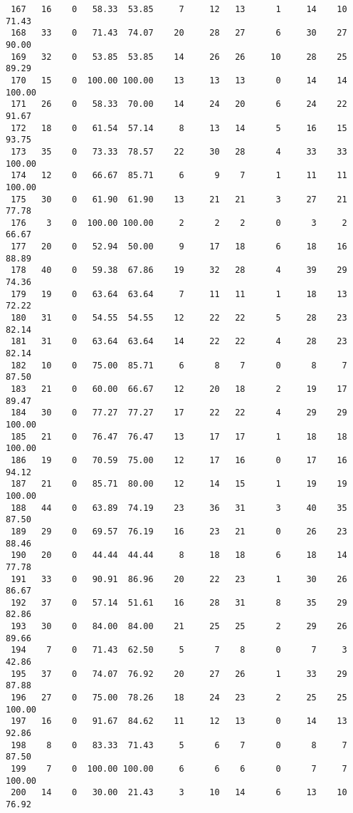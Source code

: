 \begin{verbatim}
 167   16    0   58.33  53.85     7     12   13      1     14    10    71.43
 168   33    0   71.43  74.07    20     28   27      6     30    27    90.00
 169   32    0   53.85  53.85    14     26   26     10     28    25    89.29
 170   15    0  100.00 100.00    13     13   13      0     14    14   100.00
 171   26    0   58.33  70.00    14     24   20      6     24    22    91.67
 172   18    0   61.54  57.14     8     13   14      5     16    15    93.75
 173   35    0   73.33  78.57    22     30   28      4     33    33   100.00
 174   12    0   66.67  85.71     6      9    7      1     11    11   100.00
 175   30    0   61.90  61.90    13     21   21      3     27    21    77.78
 176    3    0  100.00 100.00     2      2    2      0      3     2    66.67
 177   20    0   52.94  50.00     9     17   18      6     18    16    88.89
 178   40    0   59.38  67.86    19     32   28      4     39    29    74.36
 179   19    0   63.64  63.64     7     11   11      1     18    13    72.22
 180   31    0   54.55  54.55    12     22   22      5     28    23    82.14
 181   31    0   63.64  63.64    14     22   22      4     28    23    82.14
 182   10    0   75.00  85.71     6      8    7      0      8     7    87.50
 183   21    0   60.00  66.67    12     20   18      2     19    17    89.47
 184   30    0   77.27  77.27    17     22   22      4     29    29   100.00
 185   21    0   76.47  76.47    13     17   17      1     18    18   100.00
 186   19    0   70.59  75.00    12     17   16      0     17    16    94.12
 187   21    0   85.71  80.00    12     14   15      1     19    19   100.00
 188   44    0   63.89  74.19    23     36   31      3     40    35    87.50
 189   29    0   69.57  76.19    16     23   21      0     26    23    88.46
 190   20    0   44.44  44.44     8     18   18      6     18    14    77.78
 191   33    0   90.91  86.96    20     22   23      1     30    26    86.67
 192   37    0   57.14  51.61    16     28   31      8     35    29    82.86
 193   30    0   84.00  84.00    21     25   25      2     29    26    89.66
 194    7    0   71.43  62.50     5      7    8      0      7     3    42.86
 195   37    0   74.07  76.92    20     27   26      1     33    29    87.88
 196   27    0   75.00  78.26    18     24   23      2     25    25   100.00
 197   16    0   91.67  84.62    11     12   13      0     14    13    92.86
 198    8    0   83.33  71.43     5      6    7      0      8     7    87.50
 199    7    0  100.00 100.00     6      6    6      0      7     7   100.00
 200   14    0   30.00  21.43     3     10   14      6     13    10    76.92

\end{verbatim}
